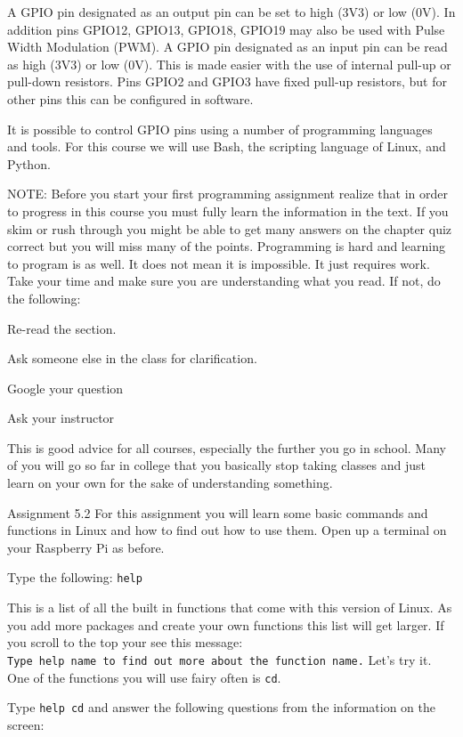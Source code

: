 \documentclass[
]{book}
\begin{document}
A GPIO pin designated as an output pin can be set to high (3V3) or low (0V). In addition pins GPIO12, GPIO13, GPIO18, GPIO19 may also be used with Pulse Width Modulation (PWM). A GPIO pin designated as an input pin can be read as high (3V3) or low (0V). This is made easier with the use of internal pull-up or pull-down resistors. Pins GPIO2 and GPIO3 have fixed pull-up resistors, but for other pins this can be configured in software.

It is possible to control GPIO pins using a number of programming languages and tools. For this course we will use Bash, the scripting language of Linux, and Python.

NOTE: Before you start your first programming assignment realize that in order to progress in this course you must fully learn the information in the text. If you skim or rush through you might be able to get many answers on the chapter quiz correct but you will miss many of the points. Programming is hard and learning to program is as well. It does not mean it is impossible. It just requires work. Take your time and make sure you are understanding what you read. If not, do the following:

Re-read the section.

Ask someone else in the class for clarification.

Google your question

Ask your instructor

This is good advice for all courses, especially the further you go in school. Many of you will go so far in college that you basically stop taking classes and just learn on your own for the sake of understanding something.

Assignment 5.2
For this assignment you will learn some basic commands and functions in Linux and how to find out how to use them.
Open up a terminal on your Raspberry Pi as before.

Type the following:
\texttt{help}

This is a list of all the built in functions that come with this version of Linux. As you add more packages and create your own functions this list will get larger. If you scroll to the top your see this message:
\texttt{Type\ \textquotesingle{}help\ name\textquotesingle{}\ to\ find\ out\ more\ about\ the\ function\ \textquotesingle{}name\textquotesingle{}.}
Let's try it. One of the functions you will use fairy often is \texttt{cd}.

Type \texttt{help\ cd} and answer the following questions from the information on the screen:
\end{document}
